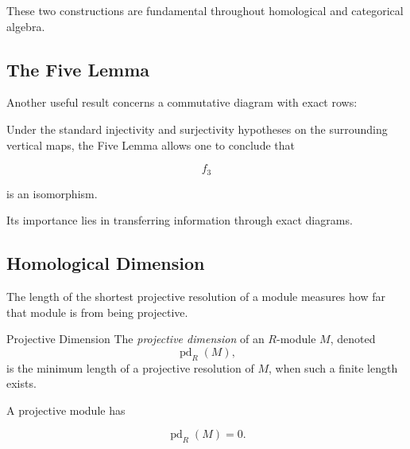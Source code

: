 These two constructions are fundamental throughout homological and
categorical algebra.

\subsection{The Five Lemma}
\label{subsec:five-lemma}

Another useful result concerns a commutative diagram with exact rows:

\begin{center}
\end{center}

Under the standard injectivity and surjectivity hypotheses on the surrounding
vertical maps, the Five Lemma allows one to conclude that

\[ f_3 \]

is an isomorphism.

Its importance lies in transferring information through exact diagrams.

\subsection{Homological Dimension}
\label{subsec:homological-dimension}

The length of the shortest projective resolution of a module measures how
far that module is from being projective.

\begin{definitionbox}{Projective Dimension}
The \emph{projective dimension} of an \(R\)-module \(M\), denoted
\[ \operatorname{pd}_R(M), \]
is the minimum length of a projective resolution of \(M\), when such a finite
length exists.
\end{definitionbox}

A projective module has

\[ \operatorname{pd}_R(M)=0. \]

